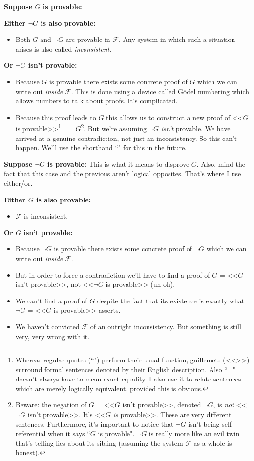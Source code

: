 \documentclass{article}
\theoremstyle{theorem}
\newcommand{\nameditem}[1]{\item\textbf{#1}}
\newcommand{\impl}{\item[$\Rightarrow$]}
\begin{document}
\begin{description}
\nameditem{Suppose $G$ is provable:}
\begin{description}
\nameditem{Either $\neg G$ is also provable:}
\begin{itemize}
\impl Both $G$ and $\neg G$ are provable in $\mathcal{F}$. Any system in which such a situation arises is also called \textit{inconsistent}.
\end{itemize}
\nameditem{Or $\neg G$ isn't provable:}
\begin{itemize}
\impl Because $G$ is provable there exists some concrete proof of $G$ which we can write out \textit{inside} $\mathcal{F}$. This is done using a device called Gödel numbering which allows numbers to talk about proofs. It's complicated.
\impl Because this proof leads to $G$ this allows us to construct a new proof of <<$G$ is provable>>\footnote{Whereas regular quotes (``") perform their usual function, guillemets (<<>>) surround formal sentences denoted by their English description. Also ``=" doesn't always have to mean exact equality. I also use it to relate sentences which are merely logically equivalent, provided this is obvious.} = $\neg G$\footnote{Beware: the negation of $G$ = <<$G$ isn't provable>>, denoted $\neg G$, is \textit{not} <<$\neg G$ isn't provable>>. It's <<$G$ \textit{is} provable>>. These are very different sentences. Furthermore, it's important to notice that $\neg G$ isn't being self-referential when it says ``$G$ is provable". $\neg G$ is really more like an evil twin that's telling lies about its sibling (assuming the system $\mathcal{F}$  as a whole is honest).}. But we're assuming $\neg G$ \textit{isn't} provable. We have arrived at a genuine contradiction, not just an inconsistency. So this can't happen. We'll use the shorthand ``\lightning" for this in the future.
\end{itemize}
\end{description}
\nameditem{Suppose $\neg G$ is provable:}
This is what it means to disprove $G$. Also, mind the fact that this case and the previous aren't logical opposites. That's where I use either/or.
\begin{description}
\nameditem{Either $G$ is also provable:}
\begin{itemize}
\impl $\mathcal{F}$ is inconsistent.
\end{itemize}
\nameditem{Or $G$ isn't provable:}
\begin{itemize}
\impl Because $\neg G$ is provable there exists some concrete proof of $\neg G$ which we can write out \textit{inside} $\mathcal{F}$.
\impl But in order to force a contradiction we'll have to find a proof of $G$ = <<$G$ isn't provable>>, not <<$\neg G$ is provable>> (uh-oh).
\impl We can't find a proof of $G$ despite the fact that its existence is exactly what $\neg G$ = <<$G$ is provable>> asserts.
\impl We haven't convicted $\mathcal{F}$ of an outright inconsistency. But something is still very, very wrong with it.
\end{itemize}
\end{description}
\end{description}
\end{document}
